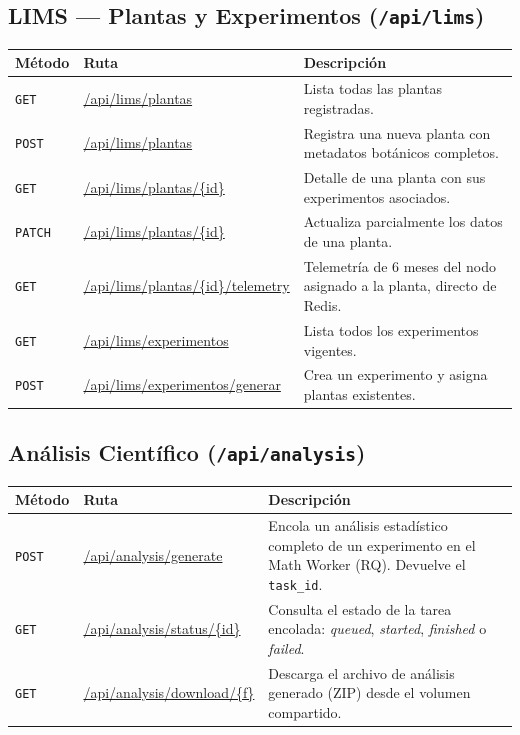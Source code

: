 \subsection{LIMS --- Plantas y Experimentos (\texttt{/api/lims})}
\begin{table}[H]
    \centering
    \begin{tabularx}{\textwidth}{lXX}
        \toprule
        \textbf{Método}   & \textbf{Ruta}                   & \textbf{Descripción} \\
        \midrule
        \texttt{GET}    & \url{/api/lims/plantas}          & Lista todas las plantas registradas. \\
        \texttt{POST}   & \url{/api/lims/plantas}          & Registra una nueva planta con metadatos botánicos completos. \\
        \texttt{GET}    & \url{/api/lims/plantas/{id}}   & Detalle de una planta con sus experimentos asociados. \\
        \texttt{PATCH}  & \url{/api/lims/plantas/{id}}   & Actualiza parcialmente los datos de una planta. \\
        \texttt{GET}    & \url{/api/lims/plantas/{id}/telemetry} & Telemetría de 6 meses del nodo asignado a la planta, directo de Redis. \\
        \texttt{GET}    & \url{/api/lims/experimentos}     & Lista todos los experimentos vigentes. \\
        \texttt{POST}   & \url{/api/lims/experimentos/generar} & Crea un experimento y asigna plantas existentes. \\
        \bottomrule
    \end{tabularx}
\end{table}

\subsection{Análisis Científico (\texttt{/api/analysis})}
\begin{table}[H]
    \centering
    \begin{tabularx}{\textwidth}{lXX}
        \toprule
        \textbf{Método} & \textbf{Ruta}                     & \textbf{Descripción} \\
        \midrule
        \texttt{POST} & \url{/api/analysis/generate}       & Encola un análisis estadístico completo de un experimento en el Math Worker (RQ). Devuelve el \texttt{task\_id}. \\
        \texttt{GET}  & \url{/api/analysis/status/{id}}  & Consulta el estado de la tarea encolada: \textit{queued}, \textit{started}, \textit{finished} o \textit{failed}. \\
        \texttt{GET}  & \url{/api/analysis/download/{f}} & Descarga el archivo de análisis generado (ZIP) desde el volumen compartido. \\
        \bottomrule
    \end{tabularx}
\end{table}

